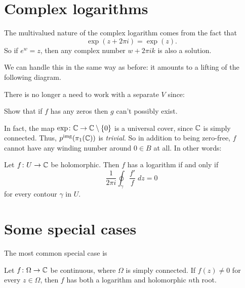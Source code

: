 \section{Complex logarithms}
The multivalued nature of the complex logarithm comes from the fact that
\[ \exp(z+2\pi i) = \exp(z). \]
So if $e^w = z$, then any complex number $w + 2\pi i k$ is also a solution.

We can handle this in the same way as before:
it amounts to a lifting of the following diagram.
\begin{center}
\end{center}
There is no longer a need to work with a separate $V$ since:
\begin{ques}
	Show that if $f$ has any zeros then $g$ can't possibly exist.
\end{ques}
In fact, the map $\exp \colon \mathbb C \to \mathbb C\setminus\{0\}$ is a universal cover,
since $\mathbb C$ is simply connected.
Thus, $p^{\text{img}}(\pi_1(\mathbb C))$ is \emph{trivial}.
So in addition to being zero-free, $f$ cannot have any winding number around $0 \in B$ at all.
In other words:
\begin{theorem}
	\label{thm:holomorphic_log}
	Let $f \colon U \to \mathbb C$ be holomorphic.
	Then $f$ has a logarithm if and only if
	\[ \frac{1}{2\pi i}\oint_\gamma \frac{f'}{f} \; dz  = 0 \]
	for every contour $\gamma$ in $U$.
\end{theorem}

\section{Some special cases}
The most common special case is
\begin{corollary}
	\label{cor:nonvanishing}
	Let $f \colon \Omega \to \mathbb C$ be continuous, where $\Omega$ is simply connected.
	If $f(z) \neq 0$ for every $z \in \Omega$,
	then $f$ has both a logarithm and holomorphic $n$th root.
\end{corollary}

